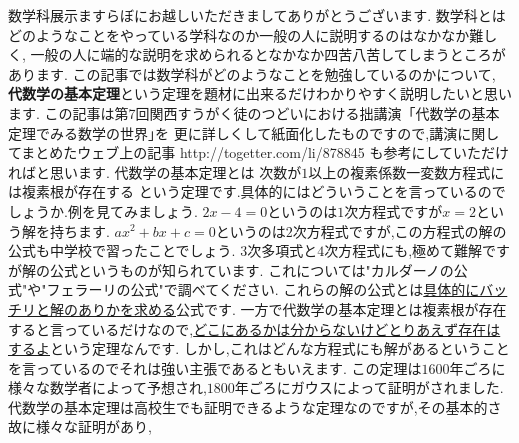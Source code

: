 


数学科展示ますらぼにお越しいただきましてありがとうございます.
数学科とはどのようなことをやっている学科なのか一般の人に説明するのはなかなか難しく,
一般の人に端的な説明を求められるとなかなか四苦八苦してしまうところがあります.
この記事では数学科がどのようなことを勉強しているのかについて,
\textbf{代数学の基本定理}という定理を題材に出来るだけわかりやすく説明したいと思います.
この記事は第7回関西すうがく徒のつどいにおける拙講演「代数学の基本定理でみる数学の世界｣を
更に詳しくして紙面化したものですので,講演に関してまとめたウェブ上の記事 http://togetter.com/li/878845 も参考にしていただければと思います.
代数学の基本定理とは
\thm
次数が$1$以上の複素係数一変数方程式には複素根が存在する
\thmx
という定理です.具体的にはどういうことを言っているのでしょうか.例を見てみましょう.
\ex
$2x-4=0$というのは$1$次方程式ですが$x=2$という解を持ちます.
\exx
\ex
$ax^2+bx+c=0$というのは$2$次方程式ですが,この方程式の解の公式も中学校で習ったことでしょう.
\exx
\ex
$3$次多項式と$4$次方程式にも,極めて難解ですが解の公式というものが知られています.
これについては"カルダーノの公式"や"フェラーリの公式"で調べてください.
\exx
これらの解の公式とは\underline{具体的にバッチリと解のありかを求める}公式です.
一方で代数学の基本定理とは複素根が存在すると言っているだけなので,\underline{どこにあるかは分からないけどとりあえず存在はするよ}という定理なんです.
しかし,これはどんな方程式にも解があるということを言っているのでそれは強い主張であるともいえます.
この定理は$1600$年ごろに様々な数学者によって予想され,$1800$年ごろにガウスによって証明がされました.
代数学の基本定理は高校生でも証明できるような定理なのですが,その基本的さ故に様々な証明があり,

